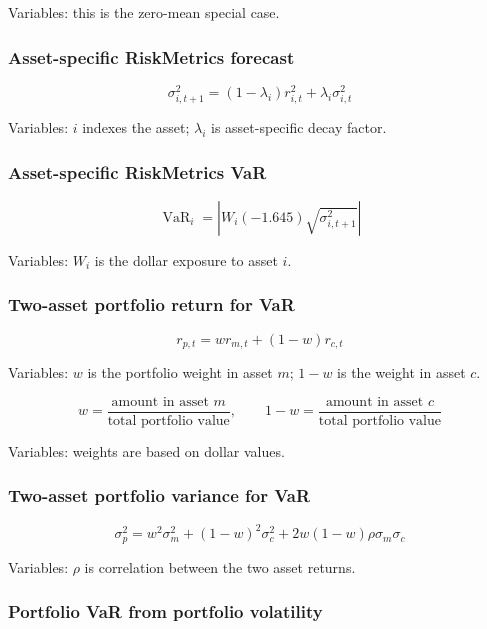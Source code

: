 \documentclass[
  8pt,
  twocolumn]{extarticle}
\begin{document}
Variables: this is the zero-mean special case.

\subsubsection{Asset-specific RiskMetrics
forecast}\label{asset-specific-riskmetrics-forecast}

\[
\sigma_{i,t+1}^2=(1-\lambda_i)r_{i,t}^2+\lambda_i\sigma_{i,t}^2
\]

Variables: \(i\) indexes the asset; \(\lambda_i\) is asset-specific
decay factor.

\subsubsection{Asset-specific RiskMetrics
VaR}\label{asset-specific-riskmetrics-var}

\[
\operatorname{VaR}_i=\left|W_i(-1.645)\sqrt{\sigma_{i,t+1}^2}\right|
\]

Variables: \(W_i\) is the dollar exposure to asset \(i\).

\subsubsection{Two-asset portfolio return for
VaR}\label{two-asset-portfolio-return-for-var}

\[
r_{p,t}=wr_{m,t}+(1-w)r_{c,t}
\]

Variables: \(w\) is the portfolio weight in asset \(m\); \(1-w\) is the
weight in asset \(c\).

\[
w=\frac{\text{amount in asset }m}{\text{total portfolio value}},\qquad
1-w=\frac{\text{amount in asset }c}{\text{total portfolio value}}
\]

Variables: weights are based on dollar values.

\subsubsection{Two-asset portfolio variance for
VaR}\label{two-asset-portfolio-variance-for-var}

\[
\sigma_p^2=w^2\sigma_m^2+(1-w)^2\sigma_c^2+2w(1-w)\rho\sigma_m\sigma_c
\]

Variables: \(\rho\) is correlation between the two asset returns.

\subsubsection{Portfolio VaR from portfolio
volatility}\label{portfolio-var-from-portfolio-volatility}
\end{document}
